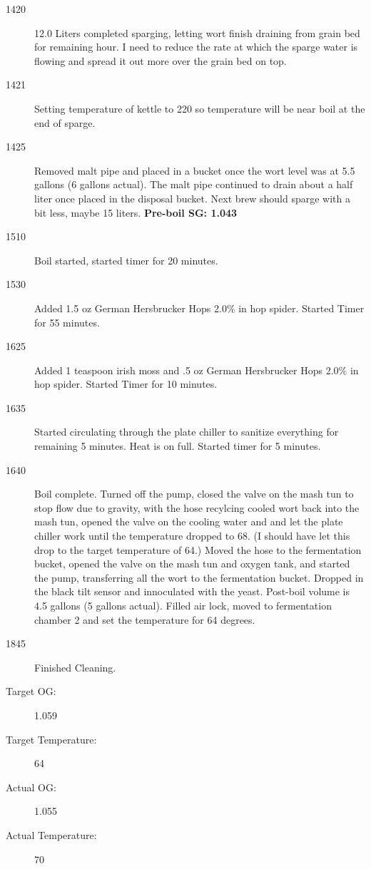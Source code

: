 \begin{description}
    \item[1420] 12.0 Liters completed sparging, letting wort finish draining from grain bed for remaining hour.  I need to reduce the rate at which the sparge water is flowing and spread it out more over the grain bed on top.
    \item[1421] Setting temperature of kettle to 220 so temperature will be near boil at the end of sparge.
    \item[1425] Removed malt pipe and placed in a bucket once the wort level was at 5.5 gallons (6 gallons actual).  The malt pipe continued to drain about a half liter once placed in the disposal bucket.  Next brew should sparge with a bit less, maybe 15 liters.  \textbf{Pre-boil SG: 1.043}
    \item[1510] Boil started, started timer for 20 minutes.
    \item[1530] Added 1.5 oz German Hersbrucker Hops 2.0\% in hop spider.  Started Timer for 55 minutes.
    \item[1625] Added 1 teaspoon irish moss and .5 oz  German Hersbrucker Hops 2.0\% in hop spider. Started Timer for 10 minutes.
    \item[1635] Started circulating through the plate chiller to sanitize everything for remaining 5 minutes.  Heat is on full. Started timer for 5 minutes.
    \item[1640] Boil complete.  Turned off the pump, closed the valve on the mash tun to stop flow due to gravity, with the hose recylcing cooled wort back into the mash tun, opened the valve on the cooling water and and let the plate chiller work until the temperature dropped to 68.  (I should have let this drop to the target temperature of 64.) Moved the hose to the fermentation bucket, opened the valve on the mash tun and oxygen tank, and started the pump, transferring all the wort to the fermentation bucket.  Dropped in the black tilt sensor and innoculated with the yeast. Post-boil volume is 4.5 gallons (5 gallons actual).  Filled air lock, moved to fermentation chamber 2 and set the temperature for 64 degrees.
    \item[1845] Finished Cleaning.

    \item[Target OG:] 1.059
    \item[Target Temperature:] 64
    \item[Actual OG:] 1.055
    \item[Actual Temperature:] 70
\end{description}

